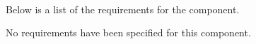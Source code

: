  \\
\par Below is a list of the requirements for the  component.

\begin{spacedenumerate}
  \item {}
\end{spacedenumerate}
\vspace{5mm} %
No requirements have been specified for this component.

